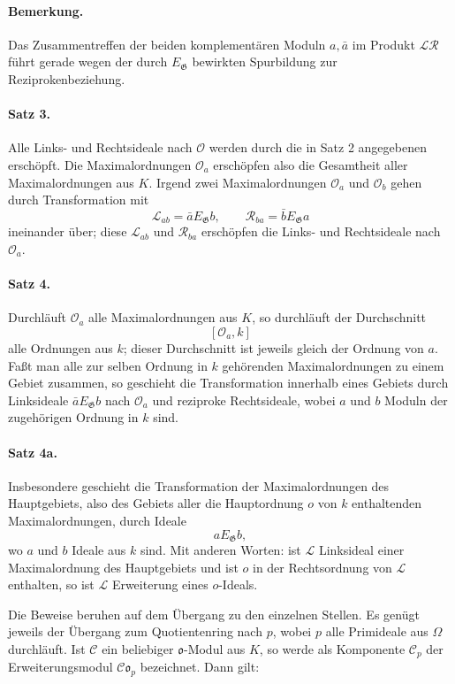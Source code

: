 \documentclass[11pt]{article}
\providecommand{\Gg}{\mathfrak G}
\providecommand{\oo}{\mathfrak o}
\begin{document}
\paragraph{Bemerkung.}
Das Zusammentreffen der beiden komplementären Moduln \(a,\bar a\) im Produkt \(\mathcal L\mathcal R\) führt gerade wegen der durch \(E_\Gg\) bewirkten Spurbildung zur Reziprokenbeziehung.

\paragraph{Satz 3.}
Alle Links- und Rechtsideale nach \(\mathcal O\) werden durch die in Satz 2 angegebenen erschöpft. Die Maximalordnungen \(\mathcal O_a\) erschöpfen also die Gesamtheit aller Maximalordnungen aus \(K\). Irgend zwei Maximalordnungen \(\mathcal O_a\) und \(\mathcal O_b\) gehen durch Transformation mit
\[
        \mathcal L_{ab}=\bar aE_\Gg b,
        \qquad
        \mathcal R_{ba}=\bar bE_\Gg a
\]
ineinander über; diese \(\mathcal L_{ab}\) und \(\mathcal R_{ba}\) erschöpfen die Links- und Rechtsideale nach \(\mathcal O_a\).

\paragraph{Satz 4.}
Durchläuft \(\mathcal O_a\) alle Maximalordnungen aus \(K\), so durchläuft der Durchschnitt
\[
        [\mathcal O_a,k]
\]
alle Ordnungen aus \(k\); dieser Durchschnitt ist jeweils gleich der Ordnung von \(a\). Faßt man alle zur selben Ordnung in \(k\) gehörenden Maximalordnungen zu einem Gebiet zusammen, so geschieht die Transformation innerhalb eines Gebiets durch Linksideale \(\bar aE_\Gg b\) nach \(\mathcal O_a\) und reziproke Rechtsideale, wobei \(a\) und \(b\) Moduln der zugehörigen Ordnung in \(k\) sind.

\paragraph{Satz 4a.}
Insbesondere geschieht die Transformation der Maximalordnungen des Hauptgebiets, also des Gebiets aller die Hauptordnung \(o\) von \(k\) enthaltenden Maximalordnungen, durch Ideale
\[
        aE_\Gg b,
\]
wo \(a\) und \(b\) Ideale aus \(k\) sind. Mit anderen Worten: ist \(\mathcal L\) Linksideal einer Maximalordnung des Hauptgebiets und ist \(o\) in der Rechtsordnung von \(\mathcal L\) enthalten, so ist \(\mathcal L\) Erweiterung eines \(o\)-Ideals.

Die Beweise beruhen auf dem Übergang zu den einzelnen Stellen. Es genügt jeweils der Übergang zum Quotientenring nach \(p\), wobei \(p\) alle Primideale aus \(\Omega\) durchläuft. Ist \(\mathcal C\) ein beliebiger \(\oo\)-Modul aus \(K\), so werde als Komponente \(\mathcal C_p\) der Erweiterungsmodul \(\mathcal C\oo_p\) bezeichnet. Dann gilt:
\end{document}
